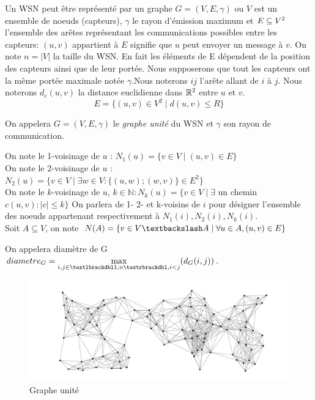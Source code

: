   Un WSN peut être représenté par un graphe $G= (V,E,\gamma)$ ou $V$ est un ensemble de noeuds (capteurs), $\gamma$ le rayon d'émission maximum et $E \subseteq V \textsuperscript{2}$ l'ensemble des arêtes représentant les communications possibles entre les capteurs: $(u,v)$ appartient à $E$ signifie que $u$ peut envoyer un  message à $v$. On note $ n=|V| $ la taille du WSN. En fait les éléments de E dépendent de la
 position des capteurs ainsi que de leur portée. Nous supposerons que tout les capteurs ont la même portée maximale notée $\gamma$.Nous noterons $ij$ l'arête allant de $i$ à $j$. Nous noterons $d_e(u,v)$ la distance euclidienne dans $\mathbb{R} \textsuperscript{2}$ entre $u$ et $v$.
$$E = \{ (u,v) \in V ^{2} \mid d(u,v) \leq R \}$$

\begin{mydef}
 On appelera $G= (V,E,\gamma)$ le \textit{graphe unité} du WSN et $\gamma$ son rayon de communication.
\end{mydef}

\begin{mydef}
On note le 1-voisinage de $u$ : $N_1(u) = \{ v \in V  \mid (u,v) \in E \}$ \\
On note le 2-voisinage de $u$ : $N_2(u) = \{ v \in V \mid  \exists w \in V :\{(u,w);(w,v)\} \in E ^2\}$ \\
On note le $k$-voisinage de $u$, $k \in \mathbb{N} : N_k(u) = \{ v \in V  \mid \exists $ un chemin $c (u,v): |c| \leq k\}$  On parlera de 1- 2- et k-voisins de $i$ pour désigner l'ensemble des noeuds appartenant respectivement à $N_1(i), N_2(i),N_k(i)$. \\
Soit $A \subseteq V$, on note $N(A) = \{ v \in V\textbackslash  A \mid \forall u\in A,(u,v) \in E \}$ \\
\end{mydef}

\begin{mydef}
 On appelera diamètre de G $diametre_G= \max\limits_{i,j\in \textlbrackdbl 1,n \textrbrackdbl,i<j} (d_G(i,j))$.
\end{mydef}
 

\begin{figure}[H]
\centering
\includegraphics[scale=0.5]{Etat_de_l'art/source/graph1.png}
\caption{Graphe unité}
\end{figure} 


